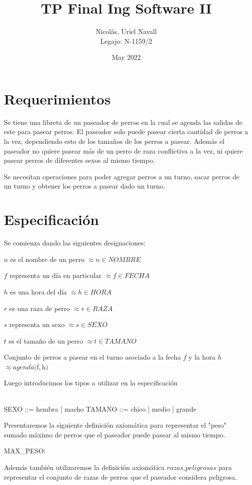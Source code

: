 \documentclass[12pt,zed]{article}
\title{TP Final Ing Software II}
\author{Nicolás, Uriel Navall \\ Legajo: N-1159/2 }
\date{May 2022}
\newcommand{\desig}[2]{\item #1 $\approx #2$}
\newenvironment{designations}
  {\begin{leftbar}
    \begin{list}{}{\setlength{\labelsep}{0cm}
                   \setlength{\labelwidth}{0cm}
                   \setlength{\listparindent}{0cm}
                   \setlength{\rightmargin}{\leftmargin}}}
  {\end{list}\end{leftbar}}
\begin{document}
\maketitle

\section*{Requerimientos}
Se tiene una libreta de un paseador de perros en la cual se agenda las salidas de este para pasear perros. El paseador solo puede pasear cierta cantidad de perros a la vez, dependiendo esto de los tamaños de los perros a pasear. Además el paseador no quiere pasear más de un perro de raza conflictiva a la vez, ni quiere pasear perros de diferentes sexos al mismo tiempo.

Se necesitan operaciones para poder agregar perros a un turno, sacar perros de un turno y obtener los perros a pasear dado un turno.

\section*{Especificación}

Se comienza dando las siguientes designaciones:
\begin{designations}
\desig{$n$ es el nombre de un perro}{n \in NOMBRE}
\desig{$f$ representa un día en particular}{f \in FECHA}
\desig{$h$ es una hora del día}{h \in HORA}
\desig{$r$ es una raza de perro}{r \in RAZA}
\desig{$s$ representa un sexo }{s \in SEXO}
\desig{$t$ es el tamaño de un perro}{t \in TAMANO}
\desig{Conjunto de perros a pasear en el turno asociado a la fecha $f$ y la hora $h$}{agenda ($f$,$h$)}
\end{designations}

Luego introducimos los tipos a utilizar en la especificación

\begin{zed}
 \\
\also
SEXO ::= hembra | macho
\also
TAMANO ::= chico | medio | grande
\end{zed}

Presentaremos la siguiente definición axiomática para representar el "peso" sumado máximo de perros que el paseador puede pasear al mismo tiempo.

\begin{axdef}
MAX\_PESO: \nat
\end{axdef}

Además también utilizaremos la definición axiomática $razas\_peligrosas$ para representar el conjunto de razas de perros que el paseador considera peligrosa.
\end{document}
